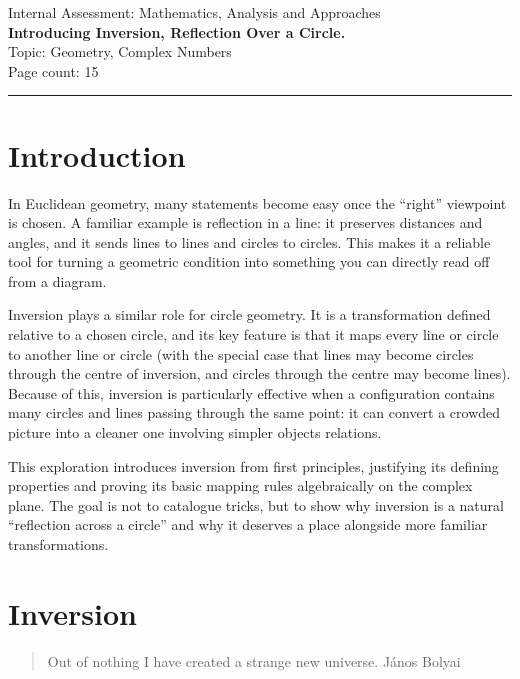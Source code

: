 \documentclass[a4paper, 12pt]{article}
\theoremstyle{definition}
\begin{document}
\begin{titlepage}
  \begin{center}
    Internal Assessment: Mathematics, Analysis and Approaches\\
    \vspace*{4cm}
    {\Large \textbf{Introducing Inversion, Reflection Over a Circle.}}\\
    \vfill
    Topic: Geometry, Complex Numbers\\
    Page count: 15
  \end{center}
\end{titlepage}
\tableofcontents
\vspace*{4em}
\hrule
\section{Introduction}

In Euclidean geometry, many statements become easy once the ``right'' viewpoint is chosen.
A familiar example is reflection in a line: it preserves distances and angles, and it sends lines to lines and circles to circles.
This makes it a reliable tool for turning a geometric condition into something you can directly read off from a diagram.

Inversion plays a similar role for circle geometry.
It is a transformation defined relative to a chosen circle, and its key feature is that it maps every line or circle to another line or circle (with the special case that lines may become circles through the centre of inversion, and circles through the centre may become lines).
Because of this, inversion is particularly effective when a configuration contains many circles and lines passing through the same point: it can convert a crowded picture into a cleaner one involving simpler objects relations.

This exploration introduces inversion from first principles, justifying its defining properties and proving its basic mapping rules algebraically on the complex plane.
The goal is not to catalogue tricks, but to show why inversion is a natural ``reflection across a circle'' and why it deserves a place alongside more familiar transformations.

\section{Inversion}
\begin{quote}
  Out of nothing I have created a strange new universe.
  \hspace{1em plus 1fill}János Bolyai
\end{quote}
\end{document}
